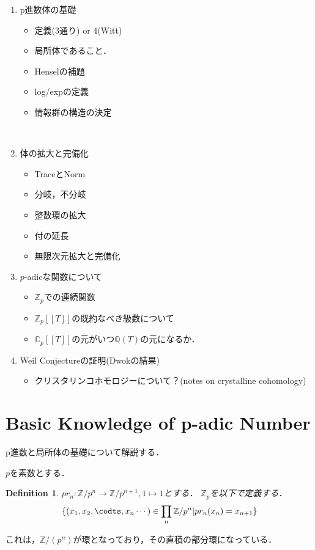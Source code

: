 \documentclass{ujarticle}
\newtheorem{dfn}[thm]{Definition}
\begin{document}
\begin{enumerate}
  \item p進数体の基礎
  \begin{itemize}
    \item 定義(3通り) or 4(Witt)
    \item 局所体であること．
    \item Henselの補題
    \item log/expの定義
    \item 情報群の構造の決定
  \end{itemize}
　\item 体の拡大と完備化
   \begin{itemize}
     \item TraceとNorm
     \item 分岐，不分岐
     \item 整数環の拡大
     \item 付の延長
     \item 無限次元拡大と完備化
   \end{itemize}
   \item $p$-adicな関数について
    \begin{itemize}
      \item $\mathbb{Z}_p$での連続関数
      \item $\mathbb{Z}_p[[T]]$の既約なべき級数について
      \item $\mathbb{C}_p[[T]]$の元がいつ$\mathbb{Q}(T)$の元になるか．
    \end{itemize}
    \item Weil Conjectureの証明(Dwokの結果)
    \begin{itemize}
      \item クリスタリンコホモロジーについて？(notes on crystalline cohomology)
    \end{itemize}
\end{enumerate}

\section{Basic Knowledge of p-adic Number}
\label{sec:p-adic Number}
p進数と局所体の基礎について解説する．

$p$を素数とする．
\begin{dfn}
$pr_n:\mathbb{Z}/p^n \to \mathbb{Z}/p^{n+1},1 \mapsto 1$とする．
$\mathbb{Z}_p$を以下で定義する．
\begin{equation*}
 \{(x_1,x_2,\codts,x_n\cdots) \in \prod_{n} \mathbb{Z}/p^n | pr_n(x_n)=x_{n+1} \}
\end{equation*}
\end{dfn}
これは，$\mathbb{Z}/(p^n)$が環となっており，その直積の部分環になっている．
\end{document}
